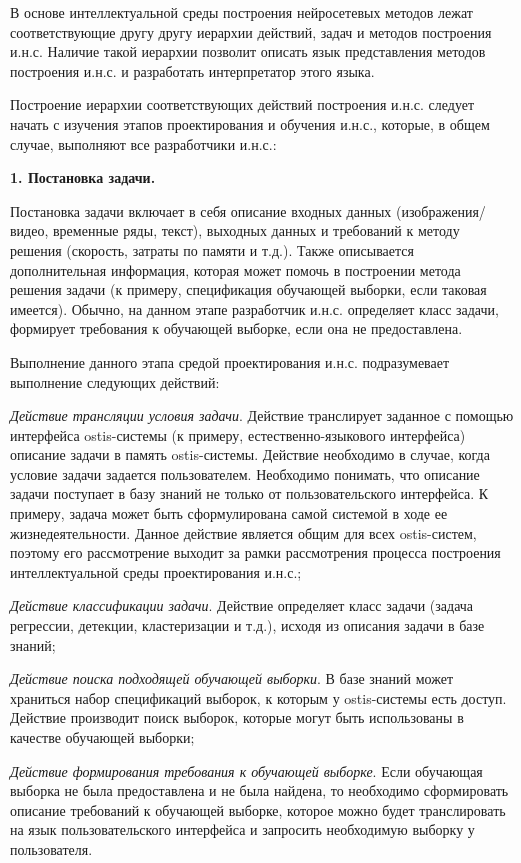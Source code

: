 В основе интеллектуальной среды построения нейросетевых методов лежат соответствующие другу другу иерархии действий, задач и методов построения и.н.с. Наличие такой иерархии позволит описать язык представления методов построения и.н.с. и разработать интерпретатор этого языка.

Построение иерархии соответствующих действий построения и.н.с. следует начать с изучения этапов проектирования и обучения и.н.с., которые, в общем случае, выполняют все разработчики и.н.с.:


\textbf{1. Постановка задачи. }

Постановка задачи включает в себя описание входных данных (изображения/видео, временные ряды, текст), выходных данных и требований к методу решения (скорость, затраты по памяти и т.д.). Также описывается дополнительная информация, которая может помочь в построении метода решения задачи (к примеру, спецификация обучающей выборки, если таковая имеется). Обычно, на данном этапе разработчик и.н.с. определяет класс задачи, формирует требования к обучающей выборке, если она не предоставлена.

Выполнение данного этапа средой проектирования и.н.с. подразумевает выполнение следующих действий:
\begin{textitemize}
	\item \textit{Действие трансляции условия задачи}. Действие транслирует заданное с помощью интерфейса ostis-системы (к примеру, естественно-языкового интерфейса) описание задачи в память ostis-системы. Действие необходимо в случае, когда условие задачи задается пользователем. Необходимо понимать, что описание задачи поступает в базу знаний не только от пользовательского интерфейса. К примеру, задача может быть сформулирована самой системой в ходе ее жизнедеятельности.
	Данное действие является общим для всех ostis-систем, поэтому его рассмотрение выходит за рамки рассмотрения процесса построения интеллектуальной среды проектирования и.н.с.;
	\item \textit{Действие классификации задачи}. Действие определяет класс задачи (задача регрессии, детекции, кластеризации и т.д.), исходя из описания задачи в базе знаний;
	\item \textit{Действие поиска подходящей обучающей выборки}. В базе знаний может храниться набор спецификаций выборок, к которым у ostis-системы есть доступ. Действие производит поиск выборок, которые могут быть использованы в качестве обучающей выборки;
	\item \textit{Действие формирования требования к обучающей выборке}. Если обучающая выборка не была предоставлена и не была найдена, то необходимо сформировать описание требований к обучающей выборке, которое можно будет транслировать на язык пользовательского интерфейса и запросить необходимую выборку у пользователя.
\end{textitemize}


